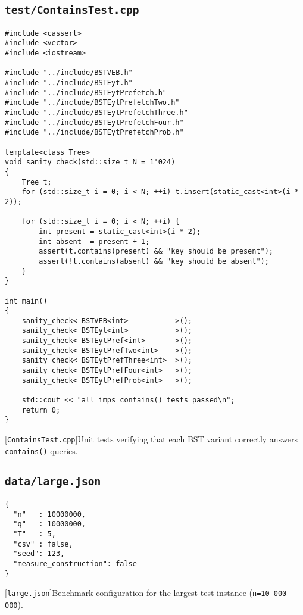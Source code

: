 \subsection{\texttt{test/ContainsTest.cpp}}
\label{secsec:test-containstest-cpp}
\begin{lstlisting}
#include <cassert>
#include <vector>
#include <iostream>

#include "../include/BSTVEB.h"
#include "../include/BSTEyt.h"
#include "../include/BSTEytPrefetch.h"
#include "../include/BSTEytPrefetchTwo.h"
#include "../include/BSTEytPrefetchThree.h"
#include "../include/BSTEytPrefetchFour.h"
#include "../include/BSTEytPrefetchProb.h"

template<class Tree>
void sanity_check(std::size_t N = 1'024)
{
    Tree t;
    for (std::size_t i = 0; i < N; ++i) t.insert(static_cast<int>(i * 2));

    for (std::size_t i = 0; i < N; ++i) {
        int present = static_cast<int>(i * 2);
        int absent  = present + 1;
        assert(t.contains(present) && "key should be present");
        assert(!t.contains(absent) && "key should be absent");
    }
}

int main()
{
    sanity_check< BSTVEB<int>           >();
    sanity_check< BSTEyt<int>           >();
    sanity_check< BSTEytPref<int>       >();
    sanity_check< BSTEytPrefTwo<int>    >();
    sanity_check< BSTEytPrefThree<int>  >();
    sanity_check< BSTEytPrefFour<int>   >();
    sanity_check< BSTEytPrefProb<int>   >();

    std::cout << "all imps contains() tests passed\n";
    return 0;
}

\end{lstlisting}
[\texttt{ContainsTest.cpp}]{Unit tests verifying that
each BST variant correctly answers \texttt{contains()} queries.}
\label{lst:test-containstest-cpp}

\subsection{\texttt{data/large.json}}
\label{secsec:data-large-json}
\begin{lstlisting}
{
  "n"   : 10000000,
  "q"   : 10000000,
  "T"   : 5,
  "csv" : false,
  "seed": 123,
  "measure_construction": false
}
\end{lstlisting}
[\texttt{large.json}]{Benchmark configuration for the
largest test instance (\texttt{n=10\,000\,000}).}
\label{lst:data-large-json}

